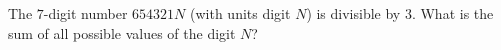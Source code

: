 The $7$-digit number $654321N$ (with units digit $N$) is divisible by $3$. What is the sum of all possible values of the digit $N$?
